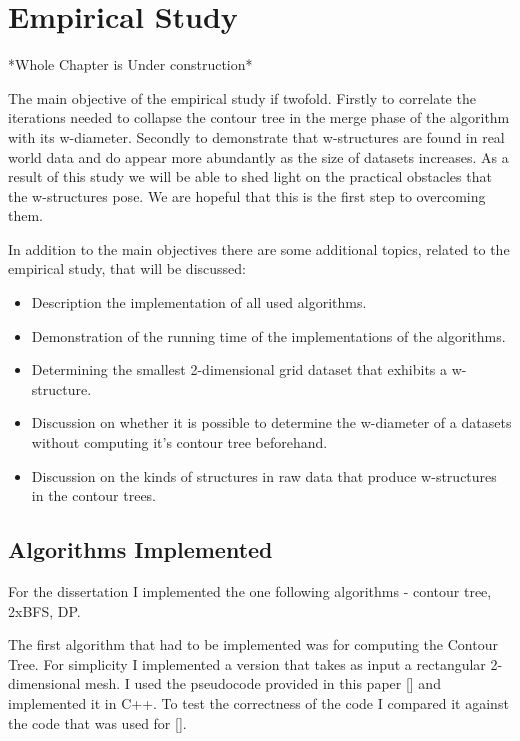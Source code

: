 \chapter{Empirical Study}
\label{chapter3}

*Whole Chapter is Under construction* 


The main objective of the empirical study if twofold. Firstly to correlate the iterations needed to collapse the contour tree in the merge phase of the algorithm with its w-diameter. Secondly to demonstrate that w-structures are found in real world data and do appear more abundantly as the size of datasets increases. As a result of this study we will be able to shed light on the practical obstacles that the w-structures pose. We are hopeful that this is the first step to overcoming them.

In addition to the main objectives there are some additional topics, related to the empirical study, that will be discussed:

\begin{itemize}
    \item Description the implementation of all used algorithms.
    \item Demonstration of the running time of the implementations of the algorithms.
    \item Determining the smallest 2-dimensional grid dataset that exhibits a w-structure.
    \item Discussion on whether it is possible to determine the w-diameter of a datasets without computing it's contour tree beforehand.
    \item Discussion on the kinds of structures in raw data that produce w-structures in the contour trees.
\end{itemize}


\section{Algorithms Implemented}

For the dissertation I implemented the one following algorithms - contour tree, 2xBFS, DP.

The first algorithm that had to be implemented was for computing the Contour Tree. For simplicity I implemented a version that takes as input a rectangular 2-dimensional mesh. I used the pseudocode provided in this paper [] and implemented it in C++. To test the correctness of the code I compared it against the code that was used for [].

